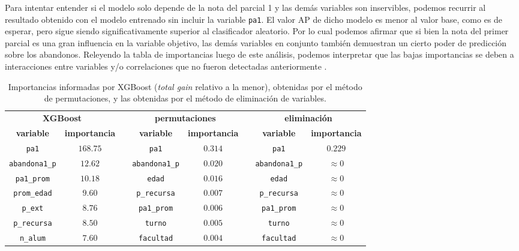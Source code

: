 \documentclass[a4paper,11pt,dvipsnames]{article}
\begin{document}
Para intentar entender si el modelo solo depende de la nota del parcial 1 y las demás variables son inservibles, podemos recurrir al resultado obtenido con el modelo entrenado sin incluir la variable \texttt{pa1}. El valor AP de dicho modelo es menor al valor base, como es de esperar, pero sigue siendo significativamente superior al clasificador aleatorio. Por lo cual podemos afirmar que si bien la nota del primer parcial es una gran influencia en la variable objetivo, las demás variables en conjunto también demuestran un cierto poder de predicción sobre los abandonos. Releyendo la tabla de importancias luego de este análisis, podemos interpretar que las bajas importancias se deben a interacciones entre variables y/o correlaciones que no fueron detectadas anteriormente \cite{AUC-based-permutation}.

\begin{table}[!ht]
    \caption{Importancias informadas por XGBoost (\textit{total gain} relativo a la menor), obtenidas por el método de permutaciones, y las obtenidas por el método de eliminación de variables.}
    \begin{center}
    \begin{tabular}{cccccccc}
    \hline
    \multicolumn{2}{c}{\textbf{XGBoost}} & & \multicolumn{2}{c}{\textbf{permutaciones}} & &\multicolumn{2}{c}{\textbf{eliminación}}\\
    \cline{1-2}
    \cline{4-5}
    \cline{7-8}
    \textbf{variable} & \textbf{importancia} && \textbf{variable} & \textbf{importancia} &&\textbf{variable} & \textbf{importancia}\\
    \hline
    \texttt{pa1}  & $168.75$ && \texttt{pa1}  & $0.314$ && \texttt{pa1}  & $0.229$\\
    \texttt{abandona1\_p} & $12.62$ && \texttt{abandona1\_p} & $0.020$ && \texttt{abandona1\_p} & $\approx 0$\\
    \texttt{pa1\_prom} & $10.18$ && \texttt{edad} & $0.016$ && \texttt{edad} & $\approx 0$ \\
    \texttt{prom\_edad} & $9.60$ && \texttt{p\_recursa} & $0.007$ && \texttt{p\_recursa} & $\approx 0$ \\
    \texttt{p\_ext} & $8.76$ && \texttt{pa1\_prom} & $0.006$ && \texttt{pa1\_prom} & $\approx 0$ \\
    \texttt{p\_recursa} & $8.50$ && \texttt{turno} & $0.005$ && \texttt{turno} & $\approx 0$ \\
    \texttt{n\_alum} & $7.60$ && \texttt{facultad} & $0.004$ && \texttt{facultad} & $\approx 0$ \\

\end{tabular}
\end{center}
\end{table}
\end{document}
